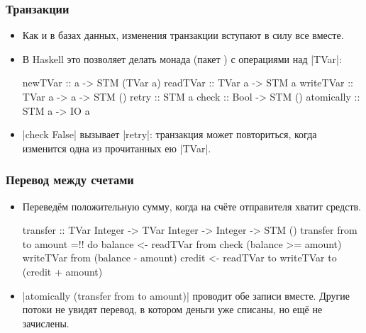 \documentclass[11pt]{beamer}
\begin{document}
\begin{frame}[fragile]
  \frametitle{Транзакции}
  \begin{itemize}
    \item Как и в базах данных, изменения транзакции вступают в силу все вместе.
    \item В Haskell это позволяет делать монада \href{https://hackage.haskell.org/package/stm/docs/Control-Concurrent-STM.html}{} (пакет ) с операциями над \haskinline|TVar|:
          \begin{haskellsmall}
            newTVar :: a -> STM (TVar a)
            readTVar :: TVar a -> STM a
            writeTVar :: TVar a -> a -> STM ()
            retry :: STM a
            check :: Bool -> STM ()
            atomically :: STM a -> IO a
          \end{haskellsmall}
    \item \haskinline|check False| вызывает \haskinline|retry|: транзакция может повториться, когда изменится одна из прочитанных ею \haskinline|TVar|.
  \end{itemize}
\end{frame}

\begin{frame}[fragile]
  \frametitle{Перевод между счетами}
  \begin{itemize}
    \item Переведём положительную сумму, когда на счёте отправителя хватит средств.
          \begin{haskellsmall}
            transfer :: TVar Integer -> TVar Integer
                     -> Integer -> STM ()
            transfer from to amount =!\pause! do
              balance <- readTVar from
              check (balance >= amount)
              writeTVar from (balance - amount)
              credit <- readTVar to
              writeTVar to (credit + amount)
          \end{haskellsmall}
          \pause
    \item \haskinline|atomically (transfer from to amount)| проводит обе записи вместе. Другие потоки не увидят перевод, в котором деньги уже списаны, но ещё не зачислены.
  \end{itemize}
\end{frame}
\end{document}
